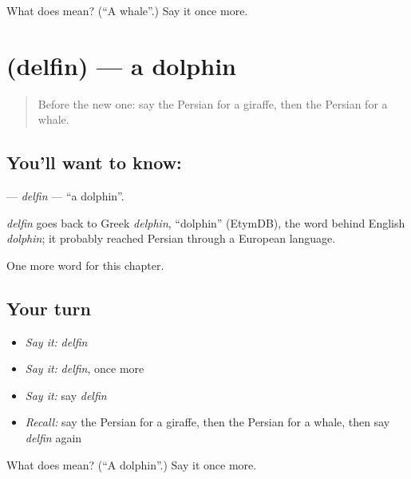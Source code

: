 \begin{tcolorbox}[breakable,colback=teal!4,colframe=teal!35!black,title={Before you move on}]
What does  mean? (\textquotedblleft{}A whale\textquotedblright{}.) Say it once more.
\end{tcolorbox}
\section[\texorpdfstring{\fa{دلفین} (delfin)}{دلفین (delfin)}]{ (delfin) — a dolphin}

\label{lesson:FA-C122-delfin}



\begin{quote}
Before the new one: say the Persian for a giraffe, then the Persian for a whale.
\end{quote}

\subsection*{You'll want to know: }
\textbf{} — \emph{delfin} — \textquotedblleft{}a dolphin\textquotedblright{}.

\begin{cousinweb}
\emph{delfin} goes back to Greek \emph{delphin}, \textquotedblleft{}dolphin\textquotedblright{} (EtymDB), the word behind English \emph{dolphin}; it probably reached Persian through a European language.
\end{cousinweb}

\begin{grammarlens}[title={What you've built}]
One more word for this chapter.
\end{grammarlens}

\subsection*{Your turn}
\begin{itemize}
\raggedright
  \item \emph{Say it:} \emph{delfin}
  \item \emph{Say it:} \emph{delfin}, once more
  \item \emph{Say it:} say \emph{delfin}
  \item \emph{Recall:} say the Persian for a giraffe, then the Persian for a whale, then say \emph{delfin} again
\end{itemize}

\begin{tcolorbox}[breakable,colback=teal!4,colframe=teal!35!black,title={Before you move on}]
What does  mean? (\textquotedblleft{}A dolphin\textquotedblright{}.) Say it once more.
\end{tcolorbox}
